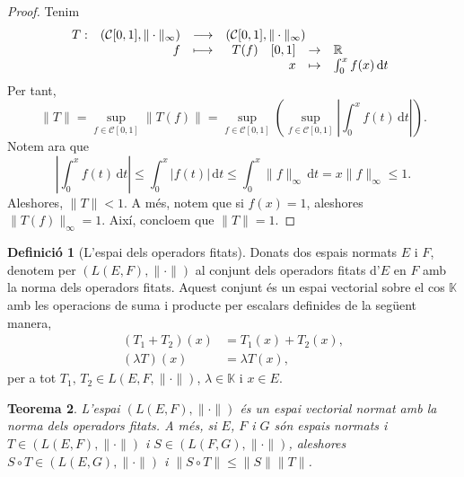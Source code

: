 \documentclass[12pt]{book}
\newtheorem{teorema}{Teorema}[chapter]
\theoremstyle{definition}
\newtheorem{defi}[teorema]{Definició}
\theoremstyle{nota}
\theoremstyle{exemple}
\begin{document}
\begin{proof}
  Tenim
  \begin{equation*}
    \begin{array}{lrcl}
      T :
      & (\mathcal{C}[0,1], \|\cdot\|_\infty)
      & \longrightarrow
      & (\mathcal{C}[0,1], \|\cdot\|_\infty) \\
      & f
      & \longmapsto
      &
        \begin{array}[t]{lrcl}
          T(f) & [0,1] & \to & \mathbb{R} \\
               & x & \mapsto & \int_0^x f(x)\, \mathrm{d}t
        \end{array}
    \end{array}
  \end{equation*}
  Per tant,
  \[
    \|T\| = \sup_{f \in \mathcal{C}[0,1]} \|T(f)\| = \sup_{f \in
      \mathcal{C}[0,1]} \left( \sup_{f \in \mathcal{C}[0,1]} \left|
        \int_0^x f(t)\, \mathrm{d}t \right| \right).
  \]
  Notem ara que
  \[
    \left| \int_0^x f(t)\, \mathrm{d}t \right| \leq \int_0^x |f(t)|\,
    \mathrm{d}t \leq \int_0^x \|f\|_\infty\, \mathrm{d}t = x
    \|f\|_\infty \leq 1.
  \]
  Aleshores, $\|T\| < 1$. A més, notem que si $f(x) = 1$, aleshores
  $\|T(f)\|_\infty = 1$. Així, concloem que $\|T\| = 1$.
\end{proof}

\begin{defi}[L'espai dels operadors fitats]
  Donats dos espais normats $E$ i $F$, denotem per
  $(L(E,F), \|\cdot\|)$ al conjunt dels operadors fitats d'$E$ en $F$
  amb la norma dels operadors fitats. Aquest conjunt és un espai
  vectorial sobre el cos $\mathbb{K}$ amb les operacions de suma i
  producte per escalars definides de la següent manera,
  \begin{align*}
    (T_1 + T_2)(x) &= T_1(x) + T_2(x), \\
    (\lambda T)(x) &= \lambda T(x),
  \end{align*}
  per a tot $T_1,\, T_2 \in L(E, F, \|\cdot\|)$,
  $\lambda \in \mathbb{K}$ i $x \in E$.
\end{defi}

\begin{teorema}
  L'espai $(L(E,F), \|\cdot\|)$ és un espai vectorial normat amb la
  norma dels operadors fitats. A més, si $E$, $F$ i $G$ són espais
  normats i $T \in (L(E,F), \|\cdot\|)$ i $S \in (L(F,G), \|\cdot\|)$,
  aleshores $S \circ T \in (L(E,G), \|\cdot\|)$ i
  $\|S \circ T\| \leq \|S\| \|T\|$.
\end{teorema}
\end{document}
